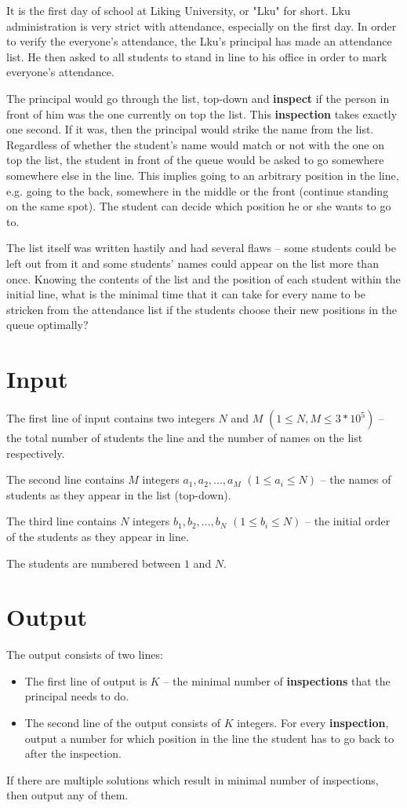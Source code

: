 It is the first day of school at Liking University, or "Lku" for short.
Lku administration is very strict with attendance, especially on the first day.
In order to verify the everyone's attendance, the Lku's principal has made an attendance list.
He then asked to all students to stand in line to his office in order to mark everyone's attendance.

The principal would go through the list, top-down and \textbf{inspect} if the person in front of him was the one currently on top the list.
This \textbf{inspection} takes exactly one second.
If it was, then the principal would strike the name from the list.
Regardless of whether the student's name would match or not with the one on top the list, the student in front of the queue would be asked to go somewhere somewhere else in the line.
This implies going to an arbitrary position in the line, e.g. going to the back, somewhere in the middle or the front (continue standing on the same spot).
The student can decide which position he or she wants to go to.

The list itself was written hastily and had several flaws -- some students could be left out from it and some students' names could appear on the list more than once.
Knowing the contents of the list and the position of each student within the initial line, what is the minimal time that it can take for every name to be stricken from the attendance list if the students choose their new positions in the queue optimally?

\section*{Input}
The first line of input contains two integers $N$ and $M$ $(1 \leq N, M \leq 3*10^5)$ -- the total number of students the line and the number of names on the list respectively.

The second line contains $M$ integers $a_1, a_2, ... , a_M$ $(1 \leq a_i \leq N)$ -- the names of students as they appear in the list (top-down).

The third line contains $N$ integers $b_1, b_2, ... , b_N$ $(1 \leq b_i \leq N)$ -- the initial order of the students as they appear in line.

The students are numbered between $1$ and $N$.

\section*{Output}
The output consists of two lines:

\begin{itemize}
\item The first line of output is $K$ -- the minimal number of \textbf{inspections} that the principal needs to do.
\item The second line of the output consists of $K$ integers. For every \textbf{inspection}, output a number for which position in the line the student has to go back to after the inspection.
\end{itemize}

If there are multiple solutions which result in minimal number of inspections, then output any of them.

